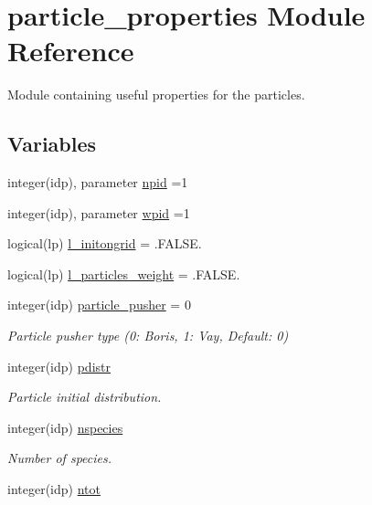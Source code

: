 \hypertarget{namespaceparticle__properties}{}\section{particle\+\_\+properties Module Reference}
\label{namespaceparticle__properties}


Module containing useful properties for the particles.  


\subsection*{Variables}
\begin{DoxyCompactItemize}
\item 
integer(idp), parameter \hyperlink{namespaceparticle__properties_a9a2b5f322610353c06693336b21439f7}{npid} =1
\item 
integer(idp), parameter \hyperlink{namespaceparticle__properties_a9661ac258a1ee308b3cad93e5da3c579}{wpid} =1
\item 
logical(lp) \hyperlink{namespaceparticle__properties_a1467b26440f0e3d53bb841a3ad51de21}{l\+\_\+initongrid} = .F\+A\+L\+S\+E.
\item 
logical(lp) \hyperlink{namespaceparticle__properties_a65c15e57d5eda084b47f9832fa67d19d}{l\+\_\+particles\+\_\+weight} = .F\+A\+L\+S\+E.
\item 
integer(idp) \hyperlink{namespaceparticle__properties_ab885434a8bf6905c7fbd9108e77175f4}{particle\+\_\+pusher} = 0
\begin{DoxyCompactList}\small\item\em Particle pusher type (0\+: Boris, 1\+: Vay, Default\+: 0) \end{DoxyCompactList}\item 
integer(idp) \hyperlink{namespaceparticle__properties_aaf6c9fb8697f29ccff6e1d82ee7f477a}{pdistr}
\begin{DoxyCompactList}\small\item\em Particle initial distribution. \end{DoxyCompactList}\item 
integer(idp) \hyperlink{namespaceparticle__properties_a5aabee3c3d0e9e902989125d50e03426}{nspecies}
\begin{DoxyCompactList}\small\item\em Number of species. \end{DoxyCompactList}\item 
integer(idp) \hyperlink{namespaceparticle__properties_a9fa6e3ec64928bf64db8c78d73f97389}{ntot}

\end{DoxyCompactItemize}
